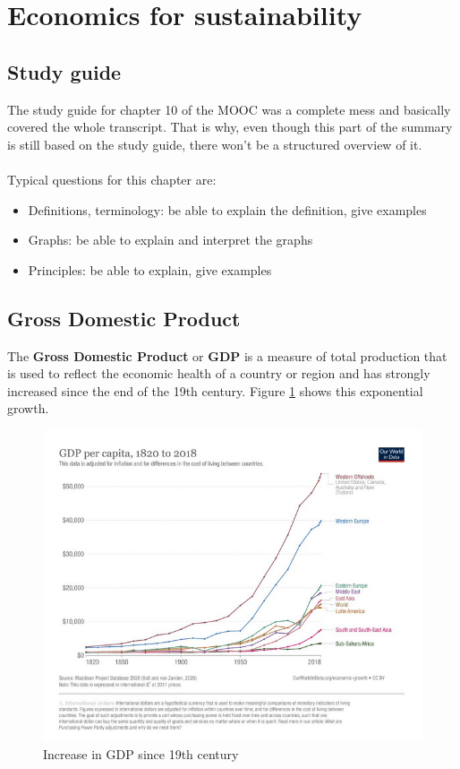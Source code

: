 \documentclass[../summary.tex]{subfiles}
\begin{document}
	
	\section{Economics for sustainability}
	
	\subsection{Study guide}
	
	The study guide for chapter 10 of the MOOC was a complete mess and basically covered the whole transcript. That is why, even though this part of the summary is still based on the study guide, there won't be a structured overview of it.
	\\\\
	Typical questions for this chapter are:
	\begin{itemize}
		\item Definitions, terminology: be able to explain the definition, give examples
		\item Graphs: be able to explain and interpret the graphs
		\item Principles: be able to explain, give examples
	\end{itemize}
	
	\subsection{Gross Domestic Product}
	
	The \textbf{Gross Domestic Product} or \textbf{GDP} is a measure of total production that is used to reflect the economic health of a country or region and has strongly increased since the end of the 19th century. Figure \ref{fig:GDP} shows this exponential growth.
		
	\begin{figure}[htbp]
		\centering
		\includegraphics[width=1\linewidth]{images/10-GDP-increase.png}
		\caption{Increase in GDP since 19th century}
		\label{fig:GDP}
	\end{figure}
	
\end{document}
